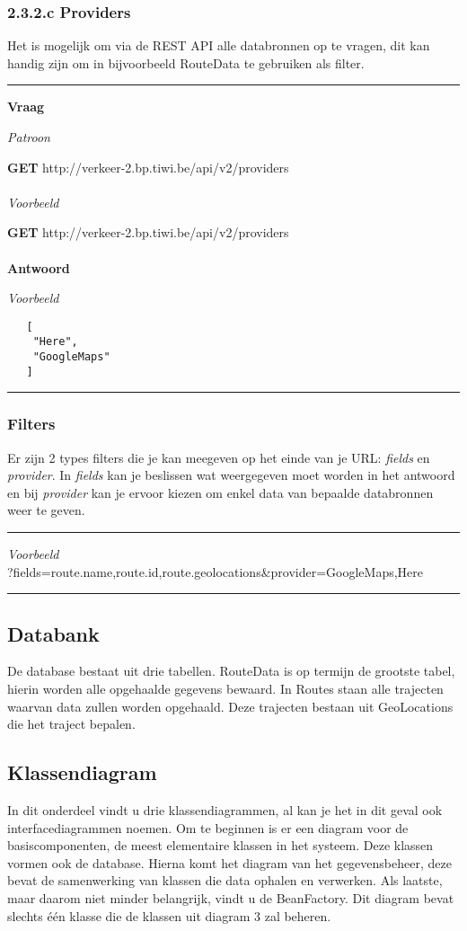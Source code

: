 \documentclass[ps,a4paper,oneside]{report}
\begin{document}
\subsubsection{2.3.2.c Providers}
Het is mogelijk om via de REST API alle databronnen op te vragen, dit kan handig zijn om in bijvoorbeeld RouteData te gebruiken als filter.\\
\noindent\rule[0.5ex]{\linewidth}{1pt}
\textbf{Vraag}

\textit{Patroon}

\textbf{GET} http://verkeer-2.bp.tiwi.be/api/v2/providers\\\\

\textit{Voorbeeld}

\textbf{GET} http://verkeer-2.bp.tiwi.be/api/v2/providers\\\\
\textbf{Antwoord}

\textit{Voorbeeld}
\begin{verbatim}
   [
    "Here",
    "GoogleMaps"
   ]
\end{verbatim}
\noindent\rule[0.5ex]{\linewidth}{1pt}
\subsubsection{Filters}
Er zijn 2 types filters die je kan meegeven op het einde van je URL: \textit{fields} en \textit{provider}. In \textit{fields} kan je beslissen wat weergegeven moet worden in het antwoord en bij \textit{provider} kan je ervoor kiezen om enkel data van bepaalde databronnen weer te geven.\\
\noindent\rule[0.5ex]{\linewidth}{1pt}
\textit{Voorbeeld}\\
?fields=route.name,route.id,route.geolocations\&provider=GoogleMaps,Here\\
\noindent\rule[0.5ex]{\linewidth}{1pt}
\clearpage
\subsection{Databank}
De database bestaat uit drie tabellen. RouteData is op termijn de grootste tabel, hierin worden alle opgehaalde gegevens bewaard. In Routes staan alle trajecten waarvan data zullen worden opgehaald. Deze trajecten bestaan uit GeoLocations die het traject bepalen.
\subsection{Klassendiagram}
In dit onderdeel vindt u drie klassendiagrammen, al kan je het in dit geval ook interfacediagrammen noemen. Om te beginnen is er een diagram voor de basiscomponenten, de meest elementaire klassen in het systeem. Deze klassen vormen ook de database. Hierna komt het diagram van het gegevensbeheer, deze bevat de samenwerking van klassen die data ophalen en verwerken. Als laatste, maar daarom niet minder belangrijk, vindt u de BeanFactory. Dit diagram bevat slechts \'e\'en klasse die de klassen uit diagram 3 zal beheren.
\end{document}
